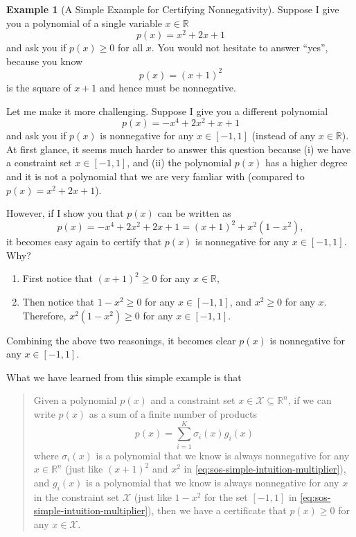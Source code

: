 \documentclass[
]{book}
\theoremstyle{definition}
\theoremstyle{definition}
\newtheorem{example}{Example}[chapter]
\theoremstyle{definition}
\theoremstyle{definition}
\theoremstyle{remark}
\begin{document}
\begin{example}[A Simple Example for Certifying Nonnegativity]
\protect\hypertarget{exm:simpleexamplesos}{}\label{exm:simpleexamplesos}Suppose I give you a polynomial of a single variable \(x \in \mathbb{R}\)
\[
p(x) = x^2 + 2x + 1
\]
and ask you if \(p(x) \geq 0\) for all \(x\). You would not hesitate to answer ``yes'', because you know
\[
p(x) = (x+1)^2 
\]
is the square of \(x+1\) and hence must be nonnegative.

Let me make it more challenging. Suppose I give you a different polynomial
\[
p(x) = -x^4 + 2 x^2 + x + 1
\]
and ask you if \(p(x)\) is nonnegative for any \(x \in [-1,1]\) (instead of any \(x \in \mathbb{R}\)). At first glance, it seems much harder to answer this question because (i) we have a constraint set \(x \in [-1,1]\), and (ii) the polynomial \(p(x)\) has a higher degree and it is not a polynomial that we are very famliar with (compared to \(p(x) = x^2 + 2x +1\)).

However, if I show you that \(p(x)\) can be written as
\begin{equation}
p(x) = -x^4 + 2 x^2 + 2x + 1 = (x+1)^2 + x^2 (1 - x^2),
\label{eq:sos-simple-intuition-multiplier}
\end{equation}
it becomes easy again to certify that \(p(x)\) is nonnegative for any \(x \in [-1,1]\). Why?

\begin{enumerate}
\def\labelenumi{\arabic{enumi}.}
\item
  First notice that \((x+1)^2 \geq 0\) for any \(x \in \mathbb{R}\),
\item
  Then notice that \(1 - x^2 \geq 0\) for any \(x \in [-1,1]\), and \(x^2 \geq 0\) for any \(x\). Therefore, \(x^2 (1-x^2) \geq 0\) for any \(x \in [-1,1]\).
\end{enumerate}

Combining the above two reasonings, it becomes clear \(p(x)\) is nonnegative for any \(x \in [-1,1]\).
\end{example}

What we have learned from this simple example is that

\begin{quote}
Given a polynomial \(p(x)\) and a constraint set \(x \in \mathcal{X} \subseteq \mathbb{R}^n\), if we can write \(p(x)\) as a sum of a finite number of products
\[
p(x) = \sum_{i=1}^K \sigma_i(x) g_i(x)
\]
where \(\sigma_i(x)\) is a polynomial that we know is always nonnegative for any \(x \in \mathbb{R}^n\) (just like \((x+1)^2\) and \(x^2\) in \eqref{eq:sos-simple-intuition-multiplier}), and \(g_i(x)\) is a polynomial that we know is always nonnegative for any \(x\) in the constraint set \(\mathcal{X}\) (just like \(1-x^2\) for the set \([-1,1]\) in \eqref{eq:sos-simple-intuition-multiplier}), then we have a certificate that \(p(x) \geq 0\) for any \(x \in \mathcal{X}\).
\end{quote}
\end{document}
